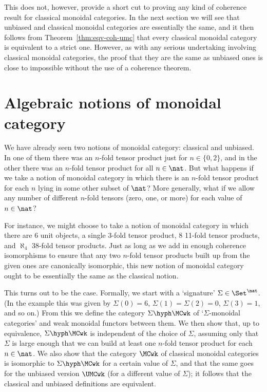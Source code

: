 This does not, however, provide a short cut to proving any kind of
coherence result for classical monoidal categories.  In the next section we
will see that unbiased and classical monoidal categories are essentially
the same, and it then follows from Theorem~\ref{thm:eqv-coh-umc} that every
classical monoidal category is equivalent to a strict one.  However, as
with any serious undertaking involving classical monoidal categories, the
proof that they are the same as unbiased ones is close to impossible
without the use of a coherence theorem.%
%
%






\section{Algebraic notions of monoidal category}


We have already seen two notions of monoidal category: classical and
unbiased.  In one of them there was an $n$-fold tensor product just for
$n\in\{0,2\}$, and in the other there was an $n$-fold tensor product for
all $n\in\nat$.  But what happens if we take a notion of monoidal category
in which there is an $n$-fold tensor product for each $n$ lying in some
other subset of $\nat$?  More generally, what if we allow any number of
different $n$-fold tensors (zero, one, or more) for each value of
$n\in\nat$?  

For instance, we might choose to take a notion of monoidal category in
which there are 6 unit objects, a single 3-fold tensor product, 8 11-fold
tensor products, and $\aleph_4$ 38-fold tensor products.  Just as long as
we add in enough coherence isomorphisms to ensure that any two $n$-fold
tensor products built up from the given ones are canonically isomorphic,
this new notion of monoidal category ought to be essentially the same as
the classical notion.  

This turns out to be the case.  Formally, we start with a `signature'%
%
%
$\Sigma \in \Set^\nat$.  (In the example this was given by $\Sigma(0)=6$,
$\Sigma(1)=\Sigma(2)=0$, $\Sigma(3)=1$, and so on.)  From this we define
the category $\Sigma\hyph\MCwk$ of `$\Sigma$-monoidal%
%
%
%
%
categories' and weak
monoidal functors between them.  We then show that, up to equivalence,
$\Sigma\hyph\MCwk$ is independent of the choice of $\Sigma$, assuming only
that $\Sigma$ is large enough that we can build at least one $n$-fold
tensor product for each $n\in\nat$.  We also show that the category $\MCwk$
of classical monoidal categories is isomorphic to $\Sigma\hyph\MCwk$ for a
certain value of $\Sigma$, and that the same goes for the unbiased version
$\UMCwk$ (for a different value of $\Sigma$); it follows that the
classical%
%
%
and unbiased definitions are equivalent.

